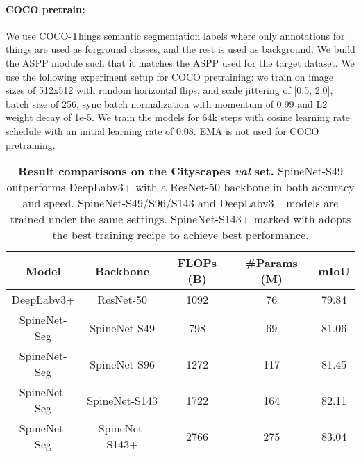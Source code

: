 \documentclass[10pt,twocolumn,letterpaper]{article}
\begin{document}
\paragraph{COCO pretrain:}
We use COCO-Things semantic segmentation labels where only annotations for things are used as forground classes, and the rest is used as background. We build the ASPP module such that it matches the ASPP used for the target dataset. We use the following experiment setup for COCO pretraining: we train on image sizes of 512x512 with random horizontal flips, and scale jittering of [0.5, 2.0], batch size of 256, sync batch normalization with momentum of 0.99 and L2 weight decay of 1e-5. We train the models for 64k steps with cosine learning rate schedule with an initial learning rate of 0.08. EMA is not used for COCO pretraining.

\setlength{\tabcolsep}{4pt}
\begin{table*}[t!]
\centering
\begin{tabular}{c| c | c  c | c}
  \toprule
  Model & Backbone & FLOPs (B) & \#Params (M) & mIoU  \\
  \midrule
  DeepLabv3+ & ResNet-50 & 1092  & 76 & 79.84 \\
  \midrule
  SpineNet-Seg & SpineNet-S49 & 798 & 69 & 81.06 \\
  SpineNet-Seg & SpineNet-S96 & 1272 & 117 & 81.45 \\
  SpineNet-Seg & SpineNet-S143 & 1722 & 164 & 82.11 \\
  SpineNet-Seg & SpineNet-S143+ & 2766 & 275 & 83.04 \\
  \bottomrule
\end{tabular}
\caption{\textbf{Result comparisons on the Cityscapes \textit{val} set.} SpineNet-S49 outperforms DeepLabv3+ with a ResNet-50 backbone in both accuracy and speed. SpineNet-S49/S96/S143 and DeepLabv3+ models are trained under the same settings. SpineNet-S143+ marked with  adopts the best training recipe to achieve best performance.}
\label{tab:cityscapes_main} 
\end{table*}
\setlength{\tabcolsep}{4pt}
\end{document}
